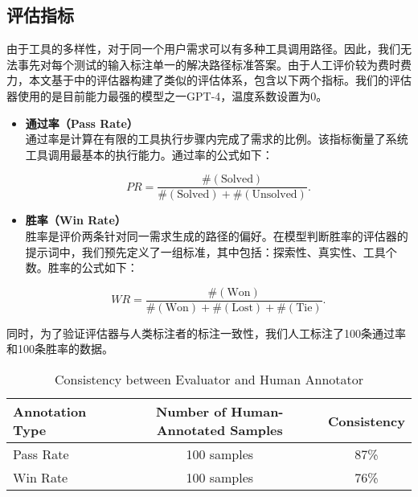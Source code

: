 \subsection{评估指标}
由于工具的多样性，对于同一个用户需求可以有多种工具调用路径。因此，我们无法事先对每个测试的输入标注单一的解决路径标准答案。由于人工评价较为费时费力，本文基于\cite{Tang2023}中的评估器构建了类似的评估体系，包含以下两个指标。我们的评估器使用的是目前能力最强的模型之一GPT-4，温度系数设置为0。

\begin{itemize}
    \item \textbf{通过率（Pass Rate）} \\
    通过率是计算在有限的工具执行步骤内完成了需求的比例。该指标衡量了系统工具调用最基本的执行能力。通过率的公式如下：

    \begin{equation}
        PR = \frac{ \#(\text{Solved}) }{ \#(\text{Solved}) + \#(\text{Unsolved}) }.
    \end{equation}

    \item \textbf{胜率（Win Rate）} \\
    胜率是评价两条针对同一需求生成的路径的偏好。在模型判断胜率的评估器的提示词中，我们预先定义了一组标准，其中包括：探索性、真实性、工具个数。胜率的公式如下：

    \begin{equation}
        WR = \frac{ \#(\text{Won}) }{ \#(\text{Won}) + \#(\text{Lost}) + \#(\text{Tie}) }.
    \end{equation}

\end{itemize}

同时，为了验证评估器与人类标注者的标注一致性，我们人工标注了100条通过率和100条胜率的数据。

\begin{table}[h]
  \centering
  \caption{Consistency between Evaluator and Human Annotator}
  \begin{tabular}{lcc}
  \hline
  \textbf{Annotation Type} & \textbf{Number of Human-Annotated Samples} & \textbf{Consistency} \\ \hline
  Pass Rate & 100 samples & 87\% \\
  Win Rate & 100 samples & 76\% \\ \hline
  \end{tabular}
  \label{tab:consistency}
  \end{table}
  
  \noindent


